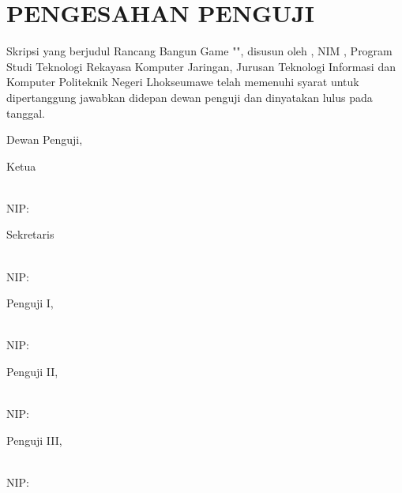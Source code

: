 \chapter*{PENGESAHAN PENGUJI}
\noindent

Skripsi yang berjudul Rancang Bangun Game "\judulId", disusun oleh \mahasiswa, NIM \nim, Program Studi Teknologi Rekayasa Komputer Jaringan, Jurusan Teknologi Informasi dan Komputer Politeknik Negeri Lhokseumawe telah memenuhi syarat untuk dipertanggung jawabkan didepan dewan penguji dan dinyatakan lulus pada tanggal.


\vspace*{1cm}
\noindent 
\tabto{5.8cm}Dewan Penguji,\\
\noindent \begin{minipage}[t]{0.45\linewidth}
\noindent
Ketua
  
\vspace*{2cm}
\textbf{\ketua} \\
NIP: \nipKetua
\end{minipage}
\hspace{0.1\linewidth}
\begin{minipage}[t]{0.45\linewidth}
  \noindent
  Sekretaris
  
  \vspace*{2cm}
  \textbf{\sekretaris} \\
  NIP: \nipSekretaris
\end{minipage}

\vspace*{1cm}
\noindent \begin{minipage}[t]{0.43\linewidth}
\noindent
Penguji I,
  
\vspace*{2cm}
\raggedright \textbf{\kaprodi} \\
NIP: \nipKaprodi
\end{minipage}
\begin{minipage}[t]{0.345\linewidth}
  \noindent
  Penguji II,
  
  \vspace*{2cm}
  \textbf{\pembahaskedua} \\
  NIP: \nipPembahaskedua
\end{minipage}
\hspace{0.01\linewidth}
\begin{minipage}[t]{0.35\linewidth}
  \noindent
  Penguji III,
  
  \vspace*{2cm}
  \textbf{\ketua} \\
  NIP: \nipKetua
\end{minipage}


